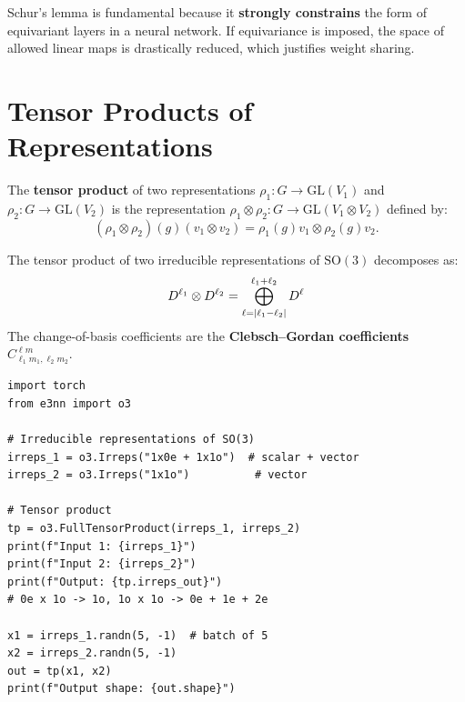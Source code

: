 \begin{intuition}[title=\textbf{Importance of Schur's lemma}]
Schur's lemma is fundamental because it \textbf{strongly constrains} the form
of equivariant layers in a neural network. If equivariance is imposed, the
space of allowed linear maps is drastically reduced, which justifies weight
sharing.
\end{intuition}

\section{Tensor Products of Representations}

\begin{definition}
The \textbf{tensor product} of two representations $\rho_1: G \to \mathrm{GL}(V_1)$
and $\rho_2: G \to \mathrm{GL}(V_2)$ is the representation
$\rho_1 \otimes \rho_2: G \to \mathrm{GL}(V_1 \otimes V_2)$ defined by:
\[
    (\rho_1 \otimes \rho_2)(g)(v_1 \otimes v_2) = \rho_1(g)v_1 \otimes \rho_2(g)v_2.
\]
\end{definition}

\begin{theorem}
The tensor product of two irreducible representations of $\mathrm{SO}(3)$
decomposes as:
\[
    D^{\ell_1} \otimes D^{\ell_2} = \bigoplus_{\ell=\left| \ell_1-\ell_2 \right|}^{\ell_1+\ell_2} D^{\ell}
\]
The change-of-basis coefficients are the \textbf{Clebsch--Gordan coefficients}
$C^{\ell m}_{\ell_1 m_1, \ell_2 m_2}$.
\end{theorem}

\begin{codeblock}[title=\textbf{Tensor product with e3nn}]
\begin{verbatim}
import torch
from e3nn import o3

# Irreducible representations of SO(3)
irreps_1 = o3.Irreps("1x0e + 1x1o")  # scalar + vector
irreps_2 = o3.Irreps("1x1o")          # vector

# Tensor product
tp = o3.FullTensorProduct(irreps_1, irreps_2)
print(f"Input 1: {irreps_1}")
print(f"Input 2: {irreps_2}")
print(f"Output: {tp.irreps_out}")
# 0e x 1o -> 1o, 1o x 1o -> 0e + 1e + 2e

x1 = irreps_1.randn(5, -1)  # batch of 5
x2 = irreps_2.randn(5, -1)
out = tp(x1, x2)
print(f"Output shape: {out.shape}")
\end{verbatim}
\end{codeblock}

